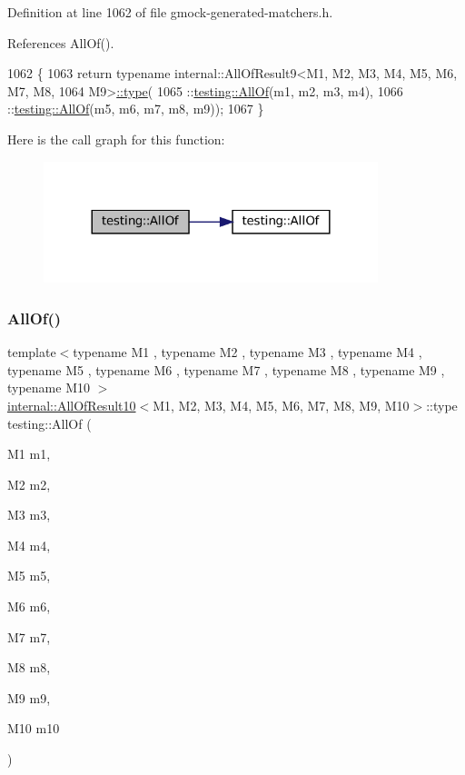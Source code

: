 Definition at line 1062 of file gmock-\/generated-\/matchers.\+h.



References All\+Of().


\begin{DoxyCode}
1062                                                                      \{
1063   \textcolor{keywordflow}{return} \textcolor{keyword}{typename} internal::AllOfResult9<M1, M2, M3, M4, M5, M6, M7, M8,
1064       M9>\hyperlink{namespacegenerate__debs_a50bc9a7ecac9584553e089a448bcde58}{::type}(
1065       ::\hyperlink{namespacetesting_af7618e8606c1cb45738163688944e2b7}{testing::AllOf}(m1, m2, m3, m4),
1066       ::\hyperlink{namespacetesting_af7618e8606c1cb45738163688944e2b7}{testing::AllOf}(m5, m6, m7, m8, m9));
1067 \}
\end{DoxyCode}
Here is the call graph for this function\+:
\nopagebreak
\begin{figure}[H]
\begin{center}
\leavevmode
\includegraphics[width=276pt]{namespacetesting_aaecf2bd8eb7c68b119f9b81a01942b7f_cgraph}
\end{center}
\end{figure}
\mbox{\label{namespacetesting_a9939c08664efeed0c1983090115f7ecb}} 
\subsubsection{\texorpdfstring{All\+Of()}{AllOf()}\hspace{0.1cm}{\footnotesize\ttfamily [9/9]}}
{\footnotesize\ttfamily template$<$typename M1 , typename M2 , typename M3 , typename M4 , typename M5 , typename M6 , typename M7 , typename M8 , typename M9 , typename M10 $>$ \\
\hyperlink{structtesting_1_1internal_1_1AllOfResult10}{internal\+::\+All\+Of\+Result10}$<$M1, M2, M3, M4, M5, M6, M7, M8, M9, M10$>$\+::type testing\+::\+All\+Of (\begin{DoxyParamCaption}\item[{M1}]{m1,  }\item[{M2}]{m2,  }\item[{M3}]{m3,  }\item[{M4}]{m4,  }\item[{M5}]{m5,  }\item[{M6}]{m6,  }\item[{M7}]{m7,  }\item[{M8}]{m8,  }\item[{M9}]{m9,  }\item[{M10}]{m10 }\end{DoxyParamCaption})\hspace{0.3cm}{\ttfamily [inline]}}



